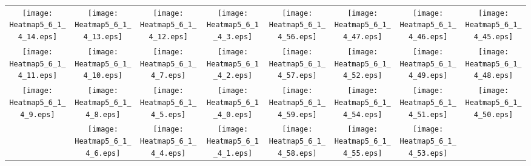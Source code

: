 \documentclass{standalone}
\begin{document}
\begin{tabular}{ *8{c} }
\texttt{[image: Heatmap5\_6\_1\_4\_14.eps]} & \texttt{[image: Heatmap5\_6\_1\_4\_13.eps]} & \texttt{[image: Heatmap5\_6\_1\_4\_12.eps]} & \texttt{[image: Heatmap5\_6\_1\_4\_3.eps]} & \texttt{[image: Heatmap5\_6\_1\_4\_56.eps]} & \texttt{[image: Heatmap5\_6\_1\_4\_47.eps]} & \texttt{[image: Heatmap5\_6\_1\_4\_46.eps]} & \texttt{[image: Heatmap5\_6\_1\_4\_45.eps]} \\
\texttt{[image: Heatmap5\_6\_1\_4\_11.eps]} & \texttt{[image: Heatmap5\_6\_1\_4\_10.eps]} & \texttt{[image: Heatmap5\_6\_1\_4\_7.eps]} & \texttt{[image: Heatmap5\_6\_1\_4\_2.eps]} & \texttt{[image: Heatmap5\_6\_1\_4\_57.eps]} & \texttt{[image: Heatmap5\_6\_1\_4\_52.eps]} & \texttt{[image: Heatmap5\_6\_1\_4\_49.eps]} & \texttt{[image: Heatmap5\_6\_1\_4\_48.eps]} \\
\texttt{[image: Heatmap5\_6\_1\_4\_9.eps]} & \texttt{[image: Heatmap5\_6\_1\_4\_8.eps]} & \texttt{[image: Heatmap5\_6\_1\_4\_5.eps]} & \texttt{[image: Heatmap5\_6\_1\_4\_0.eps]} & \texttt{[image: Heatmap5\_6\_1\_4\_59.eps]} & \texttt{[image: Heatmap5\_6\_1\_4\_54.eps]} & \texttt{[image: Heatmap5\_6\_1\_4\_51.eps]} & \texttt{[image: Heatmap5\_6\_1\_4\_50.eps]} \\
 & \texttt{[image: Heatmap5\_6\_1\_4\_6.eps]} & \texttt{[image: Heatmap5\_6\_1\_4\_4.eps]} & \texttt{[image: Heatmap5\_6\_1\_4\_1.eps]} & \texttt{[image: Heatmap5\_6\_1\_4\_58.eps]} & \texttt{[image: Heatmap5\_6\_1\_4\_55.eps]} & \texttt{[image: Heatmap5\_6\_1\_4\_53.eps]} &  
\end{tabular}
\end{document}
